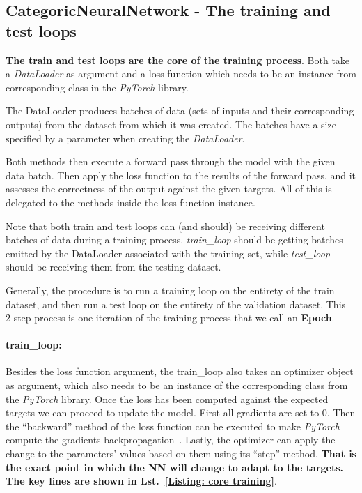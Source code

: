 \documentclass[a4paper, 11pt]{report}
\begin{document}
    \subsection{CategoricNeuralNetwork - The training and test loops}
    \textbf{The train and test loops are the core of the training process}. Both take a \textit{DataLoader} as argument and  a loss function which needs to be an instance from corresponding class in the \textit{PyTorch} library.

    The DataLoader produces batches of data (sets of inputs and their corresponding outputs) from the dataset from which it was created. The batches have a size specified by a parameter when creating the \textit{DataLoader}.

    Both methods then execute a forward pass through the model with the given data batch. Then apply the loss function to the results of the forward pass, and it assesses the correctness of the output against the given targets.  All of this is delegated to the methods inside the loss function instance.

    Note that both train and test loops can (and should) be receiving different batches of data during a training process. \textit{train\_loop} should be getting batches emitted by the DataLoader associated with the training set, while \textit{test\_loop} should be receiving them from the testing dataset.

    Generally, the procedure is to run a training loop on the entirety of the train dataset, and then run a test loop on the entirety of the validation dataset. This 2-step process is one iteration of the training process that we call an \textbf{Epoch}.

    \paragraph{train\_loop:} Besides the loss function argument, the train\_loop also takes an optimizer object as argument, which also needs to be an instance of the corresponding class from the \textit{PyTorch} library. Once the loss has been computed against the expected targets we can proceed to update the model. First all gradients are set to 0. Then the ``backward'' method of the loss function can be executed to make \textit{PyTorch} compute the gradients backpropagation~\cite{Rumelhart1986_Backpropagation}. Lastly, the optimizer can apply the change to the parameters' values based on them using its ``step'' method. \textbf{That is the exact point in which the NN will change to adapt to the targets. The  key lines are shown in Lst.~\ref{Listing: core training}}.
\end{document}
